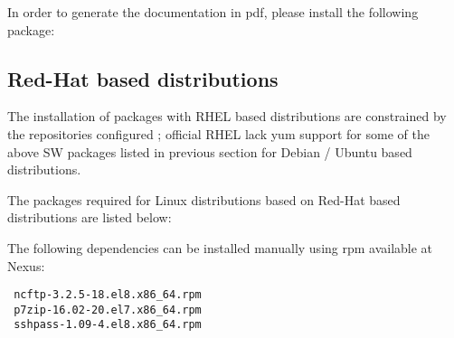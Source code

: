 \documentclass[dec_sum_main.tex]{subfiles}
\begin{document}
\noindent 
In order to generate the documentation in pdf, please install the following package:
  \newline


\subsection{Red-Hat based distributions}
 The installation of packages with RHEL based distributions are constrained by the repositories configured ; official RHEL lack yum support for some of the above SW packages listed in previous section for Debian / Ubuntu based distributions. 
 
  The packages required for Linux distributions based on Red-Hat based distributions are listed below:
  \par
  \noindent
    \newline
    \newline 
    \newline
    \newline 
    \newline
    \newline
    \newline
    \newline
    \newline
  
 \par
 \noindent 
 The following dependencies can be installed manually using rpm available at Nexus:
 \begin{Verbatim}
 ncftp-3.2.5-18.el8.x86_64.rpm
 p7zip-16.02-20.el7.x86_64.rpm
 sshpass-1.09-4.el8.x86_64.rpm
 \end{Verbatim}
 
   \newline
 
 
\end{document}
